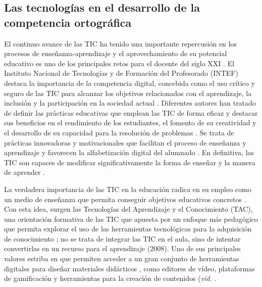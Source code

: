\documentclass[spanish]{textolivre}
\begin{document}
\subsection{Las tecnologías en el desarrollo de la competencia ortográfica}\label{sec-fmt-manuscrito}
El continuo avance de las TIC ha tenido una importante repercusión en los procesos de enseñanza-aprendizaje y el aprovechamiento de su potencial educativo es uno de los principales retos para el docente del siglo XXI \cite{unesco_competencias_2016}. El Instituto Nacional de Tecnologías y de Formación del Profesorado (INTEF) destaca la importancia de la competencia digital, concebida como el uso crítico y seguro de las TIC para alcanzar los objetivos relacionados con el aprendizaje, la inclusión y la participación en la sociedad actual \cite{instituto_nacional_de_tecnologias_y_de_formacion_del_profesorado_instituto_2017}. Diferentes autores han tratado de definir las prácticas educativas que emplean las TIC de forma eficaz \cite{budhwar_role_2017,Scaradozzi_2019,Blikstein_2021} y destacar sus beneficios en el rendimiento de los estudiantes, el fomento de su creatividad y el desarrollo de su capacidad para la resolución de problemas \cite{odorico_marco_2004,marques_graells_impacto_2013}. Se trata de prácticas innovadoras y motivacionales que facilitan el proceso de enseñanza y aprendizaje y favorecen la alfabetización digital del alumnado \cite{budhwar_role_2017}. En definitiva, las TIC son capaces de modificar significativamente la forma de enseñar y la manera de aprender \cite{odorico_marco_2004}.

La verdadera importancia de las TIC en la educación radica en su empleo como un medio de enseñanza que permita conseguir objetivos educativos concretos \cite{blazquez_propuesta_2018}. Con esta idea, surgen las Tecnologías del Aprendizaje y el Conocimiento (TAC), una orientación formativa de las TIC que apuesta por un enfoque más pedagógico que permita explorar el uso de las herramientas tecnológicas para la adquisición de conocimiento \cite{lozano_tic_2011}; no se trata de integrar las TIC en el aula, sino de intentar convertirlas en un recurso para el aprendizaje (2008). Uno de sus principales valores estriba en que permiten acceder a un gran conjunto de herramientas digitales para diseñar materiales didácticos \cite{garcia_tecnologias_2020}, como editores de vídeo, plataformas de gamificación y herramientas para la creación de contenidos (\textit{vid.} \textcite{pimbo_tiban_tecnologias_2022}.
\end{document}
